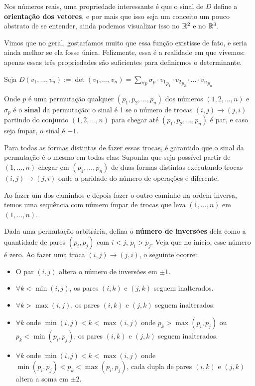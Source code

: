 \documentclass[11pt, a4paper]{article}
\begin{document}
Nos números reais, uma propriedade interessante é que o sinal de \(D\) define a \textbf{orientação dos vetores}, e por mais que isso seja um conceito um pouco abstrato de se entender, ainda podemos visualizar isso no \(\mathbb{R}^2\) e no \(\mathbb{R}^3\).

Vimos que no geral, gostaríamos muito que essa função existisse de fato, e seria ainda melhor se ela fosse única. Felizmente, essa é a realidade em que vivemos: apenas essas três propriedades são suficientes para definirmos o determinante.

Seja \(\displaystyle D(v_1,...,v_n) := \det(v_1,...,v_n)=\sum_{\forall p}{\sigma_p \cdot {v_1}_{p_1}\cdot {v_2}_{p_2} \cdot ... \cdot {v_n}_{p_n}}\)

Onde \(p\) é uma permutação qualquer \((p_1,p_2,...,p_n)\) dos números \((1,2,...,n)\) e \(\sigma_p\) é o \textbf{sinal} da permutação: o sinal é 1 se o número de trocas \((i,j)\rightarrow(j,i)\) partindo do conjunto \((1,2,...,n)\) para chegar até \((p_1,p_2,...,p_n)\) é par, e caso seja ímpar, o sinal é \(-1\). 

Para todas as formas distintas de fazer essas trocas, é garantido que o sinal da permutação é o mesmo em todas elas: Suponha que seja possível partir de \((1,...,n)\) chegar em \((p_1,...,p_n)\) de duas formas distintas executando trocas \((i,j) \rightarrow (j,i)\) onde a paridade do número de operações é diferente. 

Ao fazer um dos caminhos e depois fazer o outro caminho na ordem inversa, temos uma sequência com número ímpar de trocas que leva \((1,...,n)\) em \((1,...,n)\).

Dada uma permutação arbitrária, defina o \textbf{número de inversões} dela como a quantidade de pares \((p_i,p_j)\) com \(i<j\), \(p_i>p_j\). Veja que no início, esse número é zero. Ao fazer uma troca \((i,j) \rightarrow (j,i)\), o seguinte ocorre:

\begin{itemize}
    \item O par \((i,j)\) altera o número de inversões em \(\pm 1\).
    \item \(\forall k < \min(i,j)\), os pares \((i,k)\) e \((j,k)\) seguem inalterados.
    \item \(\forall k > \max(i,j)\), os pares \((i,k)\) e \((j,k)\) seguem inalterados.
    \item \(\forall k\) onde \(\min(i,j)<k<\max(i,j)\) onde \(p_k>\max(p_i,p_j)\) ou \(p_k<\min(p_i,p_j)\), os pares \((i,k)\) e \((j,k)\) seguem inalterados.
    \item \(\forall k\) onde \(\min(i,j)<k<\max(i,j)\) onde \(\min(p_i,p_j)<p_k<\max(p_i,p_j)\), cada dupla de pares \((i,k)\) e \((j,k)\) altera a soma em \(\pm 2\).
\end{itemize}
\end{document}
